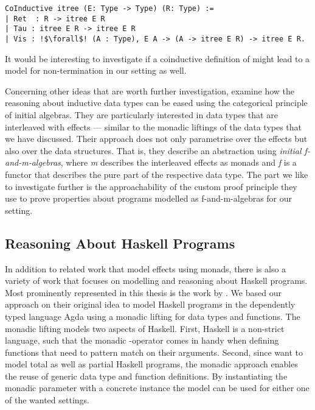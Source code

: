 \begin{verbatim}
CoInductive itree (E: Type -> Type) (R: Type) :=
| Ret  : R -> itree E R
| Tau : itree E R -> itree E R
| Vis : !$\forall$! (A : Type), E A -> (A -> itree E R) -> itree E R.
\end{verbatim}

It would be interesting to investigate if a coinductive definition of  might lead to a model for non\--termination in our setting as well.

Concerning other ideas that are worth further investigation, \citet{atkey2015interleaving} examine how the reasoning about
inductive data types can be eased using the categorical principle of initial algebras.
They are particularly interested in data types that are interleaved with effects --- similar to the monadic liftings of the data types that we have discussed.
Their approach does not only parametrise over the effects but also over the data structures.
That is, they describe an abstraction using \emph{initial f\--and\--m\--algebras}, where \emph{m} describes the interleaved effects as monads and \emph{f} is a functor that describes the pure part of the respective data type.
The part we like to investigate further is the approachability of the custom proof principle they use to prove properties about programs modelled as f\--and\--m\--algebras for our setting.

\subsection{Reasoning About Haskell Programs}

In addition to related work that model effects using monads, there is also a variety of work that focuses on modelling and reasoning about Haskell programs.
Most prominently represented in this thesis is the work by \citet{abel2005verifying}.
We based our approach on their original idea to model Haskell programs in the dependently typed language Agda using a monadic lifting for data types and functions.
The monadic lifting models two aspects of Haskell.
First, Haskell is a non\--strict language, such that the monadic \hinl{>>=}\--operator comes in handy when defining functions that need to pattern match on their arguments.
Second, since \citeauthor{abel2005verifying} want to model total as well as partial Haskell programs, the monadic approach enables the reuse of generic data type and function definitions.
By instantiating the monadic parameter with a concrete instance the model can be used for either one of the wanted settings.

